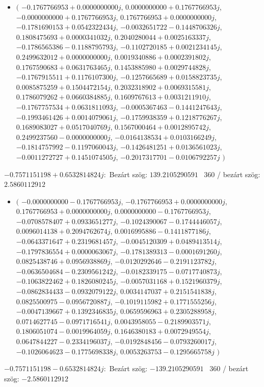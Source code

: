 \documentclass[14pt,a4paper]{article}
\begin{document}
\begin{itemize}
\item
$\big($
$-0.1767766953+0.0000000000j$, $0.0000000000+0.1767766953j$, $-0.0000000000+0.1767766953j$, $0.1767766953+0.0000000000j$, $-0.1781690153+0.0542322434j$, $-0.0032651722-0.1448706326j$, $0.1808475693+0.0000341032j$, $0.2040280044+0.0025163337j$, $-0.1786565386-0.1188795793j$, $-0.1102720185+0.0021234145j$, $0.2499632012+0.0000000000j$, $0.0019340886+0.0002391802j$, $0.1767590683+0.0631763465j$, $0.1453885980+0.0029744828j$, $-0.1767915511+0.1176107300j$, $-0.1257665689+0.0158823735j$, $0.0085875259+0.1504472154j$, $0.2032318902+0.0069315581j$, $0.1786079262+0.0660384885j$, $0.1609767613+0.0031211910j$, $-0.1767757534+0.0631811093j$, $-0.0005367463-0.1441247643j$, $-0.1993461426+0.0014079061j$, $-0.1759938359+0.1218776267j$, $0.1689083027+0.0517040769j$, $0.1567000464+0.0012895742j$, $0.2499237560-0.0000000000j$, $-0.0164138534+0.0103166249j$, $-0.1814757992-0.1197060043j$, $-0.1426481251+0.0136561023j$, $-0.0011272727+0.1451074505j$, $-0.2017317701-0.0106792257j$
$\big)$
\end{itemize}
$-0.7571151198+0.6532814824j$:\
Bezárt szög: $139.2105290591$ \
360 / bezárt szög: $2.5860112912$\
\begin{itemize}
\item
$\big($
$-0.0000000000-0.1767766953j$, $-0.1767766953+0.0000000000j$, $0.1767766953+0.0000000000j$, $0.0000000000-0.1767766953j$, $-0.0708578407+0.0933651277j$, $-0.1024390067-0.1744446057j$, $0.0096014138+0.2094762674j$, $0.0016995886-0.1411877186j$, $-0.0643371647+0.2319681457j$, $-0.0045120309+0.0489413514j$, $-0.1797836554+0.0000063067j$, $-0.1781389313-0.0001691260j$, $0.0825438746+0.0956938869j$, $-0.0120292646-0.2191123782j$, $-0.0636504684-0.2309561242j$, $-0.0182339175-0.0717740873j$, $-0.1063822462+0.1826080245j$, $-0.0057031168+0.1521960379j$, $-0.0862834433-0.0932079122j$, $0.0034147037+0.2151541838j$, $0.0825500975-0.0956720887j$, $-0.1019115982+0.1771555256j$, $-0.0047139667+0.1392346835j$, $0.0659596963+0.2305288958j$, $0.0714627745-0.0971716541j$, $0.0043958055-0.2189903571j$, $0.1806051074-0.0019964059j$, $0.1646380183+0.0072949554j$, $0.0647844227-0.2334196037j$, $-0.0192848456-0.0793260017j$, $-0.1026064623-0.1775698338j$, $0.0053263753-0.1295665758j$
$\big)$
\end{itemize}
$-0.7571151198-0.6532814824j$:\
Bezárt szög: $-139.2105290591$ \
360 / bezárt szög: $-2.5860112912$\
\end{document}
